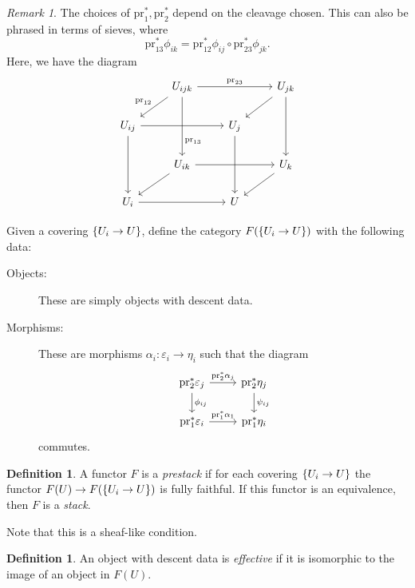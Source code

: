 \documentclass[leqno, openany]{memoir}
\theoremstyle{definition}
\newtheorem{defn}[thm]{Definition}
\theoremstyle{remark}
\newtheorem{rmk}[thm]{Remark}
\theoremstyle{plain}
\theoremstyle{definition}
\theoremstyle{remark}
\newcommand{\ep}{\varepsilon}
\newcommand{\mr}[1]{\mathrm{#1}}
\begin{document}
\begin{rmk}
    The choices of $\mr{pr}_1^*, \mr{pr}_2^*$ depend on the cleavage chosen. This can also be phrased in terms of sieves, where
    \[ \mr{pr}_{13}^* \phi_{ik} = \mr{pr}_{12}^* \phi_{ij} \circ \mr{pr}_{23}^* \phi_{jk}. \]
    Here, we have the diagram
    \begin{equation*}
    \begin{tikzcd}
        & U_{ijk} \arrow[near end]{dd}{\mr{pr}_{13}} \arrow[swap]{dl}{\mr{pr}_{12}} \arrow{rr}{\mr{pr}_{23}} & & U_{jk} \arrow{dl} \arrow{dd} \\
        U_{ij} \arrow{rr} \arrow{dd} & & U_j \arrow{dd} \\
                                     & U_{ik} \arrow{rr} \arrow{dl} & & U_k \arrow{dl} \\
        U_i \arrow{rr} & & U
    \end{tikzcd}
    \end{equation*}
\end{rmk}

Given a covering $\qty{U_i \to U}$, define the category $F(\qty{U_i \to U})$ with the following data:
\begin{description}
    \item[Objects:] These are simply objects with descent data.
    \item[Morphisms:] These are morphisms $\alpha_i \colon \ep_i \to \eta_i$ such that the diagram
        \begin{equation*}
        \begin{tikzcd}
            \mr{pr}_2^* \ep_j \arrow{d}{\phi_{ij}} \arrow{r}{\mr{pr}_2^* \alpha_j} & \mr{pr}_2^* \eta_j \arrow{d}{\psi_{ij}} \\
            \mr{pr}_1^* \ep_i \arrow{r}{\mr{pr}_1^* \alpha_1} & \mr{pr}_1^* \eta_i
        \end{tikzcd}
        \end{equation*}
        commutes.
\end{description}

\begin{defn}
    A functor $F$ is a \textit{prestack} if for each covering  $\qty{U_i \to U}$ the functor $F(U) \to F(\qty{U_i \to U})$ is fully faithful. If this functor is an equivalence, then $F$ is a \textit{stack}. 
\end{defn}

Note that this is a sheaf-like condition.

\begin{defn}
    An object with descent data is \textit{effective} if it is isomorphic to the image of an object in $F(U)$. 
\end{defn}
\end{document}
